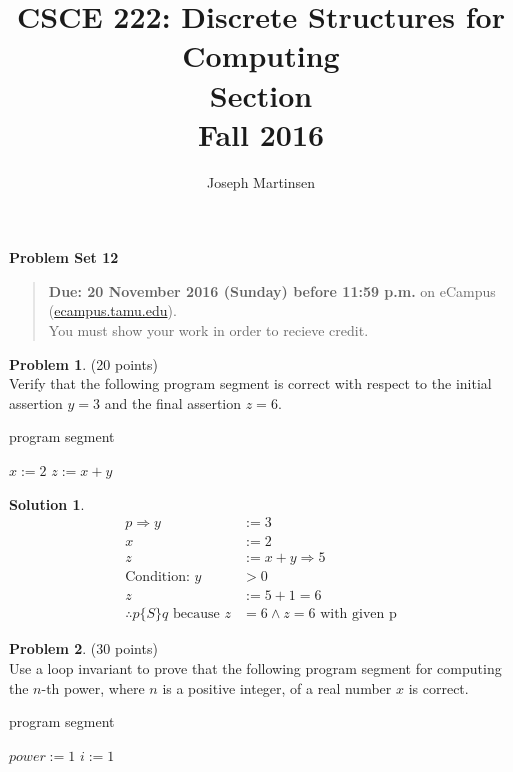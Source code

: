 \documentclass{article}
\title{CSCE 222: Discrete Structures for Computing\\Section \mysectionnumber\\Fall 2016}
\author{Joseph Martinsen}
\theoremstyle{definition}
\newtheorem{problem}{Problem}
\newtheorem*{solution}{Solution}
\newcommand{\problemset}[1]{\begin{center}\textbf{Problem Set #1}\end{center}}
\newcommand{\duedate}[1]{\begin{quote}\textbf{Due: #1} on eCampus (\url{ecampus.tamu.edu}). \\You must show your work in order to recieve credit.\end{quote}}
\begin{document}
\maketitle

\problemset{12}

\duedate{20 November 2016 (Sunday) before 11:59 p.m.}

\bigskip

\begin{problem} (20 points)\\
Verify that the following program segment is correct with respect to the initial assertion $y=3$ and the final assertion $z=6$.
\begin{algorithm}
\DontPrintSemicolon
\caption{program segment}
$x := 2$\;
$z := x + y$\;
\end{algorithm}
\end{problem}

\begin{solution}\ \\
  \begin{align*}
    p \Rightarrow y &:= 3 \\
    x &:= 2 \\
    z &:= x + y \Rightarrow 5 \\
    \text{Condition: } y &> 0 \\
    z &:= 5 + 1 = 6 \\
    \therefore p\{S\}q \text{ because } z&=6 \wedge z =6 \text{ with given p}
  \end{align*}

\end{solution}

\newpage

\begin{problem} (30 points)\\
Use a loop invariant to prove that the following program segment for computing the $n$-th power, where $n$ is a positive integer, of a real number $x$ is correct.
\begin{algorithm}
\caption{program segment}
\DontPrintSemicolon
$power := 1$\;
$i := 1$\;
\end{algorithm}
\end{problem}
\end{document}
